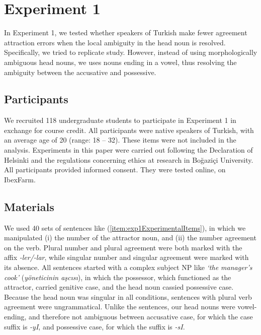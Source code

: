 \documentclass[doc,a4paper,man,natbib,floatsintext,noextraspace]{apa6}\usepackage[]{graphicx}\usepackage[]{color}
\begin{document}
\section{Experiment 1} \label{sec:exp1}



In Experiment 1, we tested whether speakers of Turkish make fewer agreement attraction errors when the local ambiguity in the head noun is resolved. 
Specifically, we tried to replicate \citet{LagoEtAl:2018} study. However, instead of using morphologically ambiguous head nouns, we uses nouns ending in a vowel, thus resolving the ambiguity between the accusative and possessive. 

\subsection{Participants} \label{sec:exp1:participants}

We recruited 118 undergraduate students to participate in Experiment 1 in exchange for course credit. All participants were native speakers of Turkish, with an average age of 20 (range: 18 -- 32). 
These items were not included in the analysis. Experiments in this paper were carried out following the Declaration of Helsinki and the regulations concerning ethics at research in Bo\u{g}azi\c{c}i University. All participants provided informed consent. They were tested online, on IbexFarm. 

\subsection{Materials} \label{sec:exp1:materials}

We used 40 sets of sentences like (\ref{item:exp1ExperimentalItems}), in which we manipulated 
(i) the number of the attractor noun, and
(ii) the number agreement on the verb. 
Plural number and plural agreement were both marked with the affix \textit{-ler/-lar}, while singular number and singular agreement were marked with its absence. 
%
All sentences started with a complex subject NP like \textit{`the manager's cook'} (\textit{yöneticinin aşcısı}), in which the possessor, which functioned as the attractor, carried genitive case, and the head noun cassied possessive case. Because the head noun was singular in all conditions, sentences with plural verb agreement were ungrammatical.
Unlike the \citet{LagoEtAl:2018} sentences, our head nouns were vowel-ending, and therefore not ambiguous between accusative case, for which the case suffix is \textit{-yI}, and possessive case, for which the suffix is \textit{-sI}. 
\end{document}
